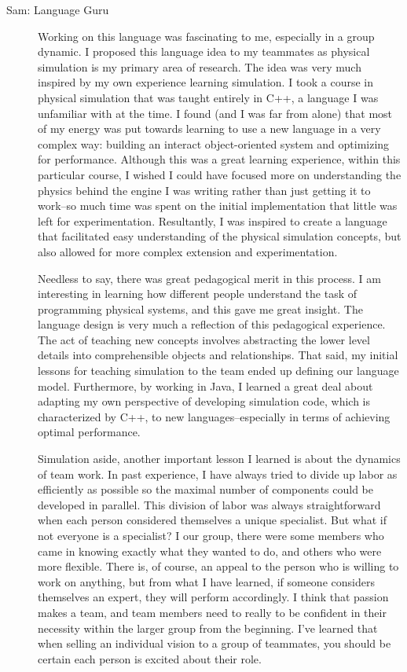 \begin{description}
\item[Sam: Language Guru] Working on this language was fascinating to
  me, especially in a group dynamic. I proposed this language idea to
  my teammates as physical simulation is my primary area of
  research. The idea was very much inspired by my own experience
  learning simulation. I took a course in physical simulation that was
  taught entirely in C++, a language I was unfamiliar with at the
  time. I found (and I was far from alone) that most of my energy was
  put towards learning to use a new language in a very complex way:
  building an interact object-oriented system and optimizing for
  performance. Although this was a great learning experience, within
  this particular course, I wished I could have focused more on
  understanding the physics behind the engine I was writing rather
  than just getting it to work--so much time was spent on the initial
  implementation that little was left for
  experimentation. Resultantly, I was inspired to create a language
  that facilitated easy understanding of the physical simulation
  concepts, but also allowed for more complex extension and
  experimentation.

  Needless to say, there was great pedagogical merit in this
  process. I am interesting in learning how different people
  understand the task of programming physical systems, and this gave
  me great insight. The language design is very much a reflection of
  this pedagogical experience. The act of teaching new concepts
  involves abstracting the lower level details into comprehensible
  objects and relationships. That said, my initial lessons for
  teaching simulation to the team ended up defining our language
  model. Furthermore, by working in Java, I learned a great deal about
  adapting my own perspective of developing simulation code, which is
  characterized by C++, to new languages--especially in terms of
  achieving optimal performance.

  Simulation aside, another important lesson I learned is about the
  dynamics of team work. In past experience, I have always tried to
  divide up labor as efficiently as possible so the maximal number of
  components could be developed in parallel. This division of labor
  was always straightforward when each person considered themselves a
  unique specialist. But what if not everyone is a specialist? I our
  group, there were some members who came in knowing exactly what they
  wanted to do, and others who were more flexible. There is, of
  course, an appeal to the person who is willing to work on anything,
  but from what I have learned, if someone considers themselves an
  expert, they will perform accordingly. I think that passion makes a
  team, and team members need to really to be confident in their
  necessity within the larger group from the beginning. I've learned
  that when selling an individual vision to a group of teammates, you
  should be certain each person is excited about their role.
	

\end{description}
